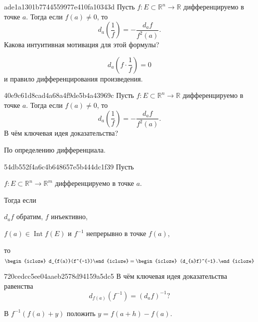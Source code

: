\begin{note}{ade1a1301b7744559977e410fa10343d}
    Пусть \({ f : E \subset \mathbb R^{n} \to \mathbb R }\) дифференцируемо в точке \({ a }\).
    Тогда если \({ f(a) \neq 0 }\), то
    \[
        d_{a}\left( \frac{1}{f} \right) = -\frac{d_{a}f}{f^2(a)}.
    \]
    Какова интуитивная мотивация для этой формулы?

    \begin{cloze}{1}
        \[
            d_{a} \left( f \cdot \frac{1}{f} \right) = 0
        \]
        и правило дифференцирования произведения.
    \end{cloze}
\end{note}

\begin{note}{40e9c61d8cad4a68a4f9de5b4a43969c}
    Пусть \({ f : E \subset \mathbb R^{n} \to \mathbb R }\) дифференцируемо в точке \({ a }\).
    Тогда если \({ f(a) \neq 0 }\), то
    \[
        d_{a}\left( \frac{1}{f} \right) = -\frac{d_{a}f}{f^2(a)}.
    \]
    В чём ключевая идея доказательства?

    \begin{cloze}{1}
        По определению дифференциала.
    \end{cloze}
\end{note}

\begin{note}{54db552f4a6c4b648657e5b444dc1f39}
    Пусть \begin{icloze}{5}\({ f : E \subset \mathbb R^{n} \to \mathbb R^{m} }\) дифференцируемо в точке \({ a }\).\end{icloze}
    Тогда если \begin{icloze}{3}\({ d_{a}f }\) обратим, \({ f }\) инъективно,\end{icloze} \begin{icloze}{2}\({ f(a) \in \operatorname{Int} f(E) }\) и \({ f^{-1} }\) непрерывно в точке \({ f(a) }\),\end{icloze} то
    \[
        \begin{icloze}{4}d_{f(a)}(f^{-1})\end{icloze} = \begin{icloze}{1}(d_{a}f)^{-1}.\end{icloze}
    \]
\end{note}

\begin{note}{720cedcc5ee04aaeb2578d94159a5dc5}
    В чём ключевая идея доказательства равенства
    \[
        d_{f(a)}(f^{-1}) = (d_{a}f)^{-1}?
    \]

    \begin{cloze}{1}
        В \({ f^{-1}(f(a) + y) }\) положить \({ y = f(a + h) - f(a) }\).
    \end{cloze}
\end{note}

